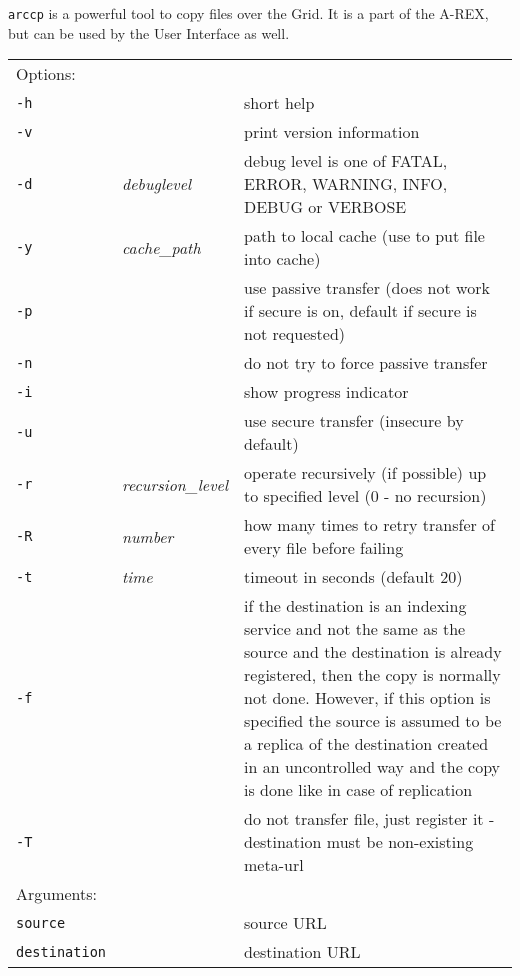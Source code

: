 \texttt{arccp} is a powerful
tool to copy files over the Grid. It is a part of the A-REX,
but can be used by the User Interface as well.
\hspace*{0.5cm}
\begin{shaded}
\end{shaded}
\begin{longtable}{llp{8cm}}
    Options:&&\\
    \texttt{-h} && short help\\
    \texttt{-v} && print version information\\
    \texttt{-d} & \textit{debuglevel} &debug level is one of  FATAL, ERROR, WARNING, INFO, DEBUG or VERBOSE\\
    \texttt{-y} & \textit{cache\_path} & path to local cache (use to put file into cache)\\
    \texttt{-p} && use passive transfer (does not work if secure is on, default if secure is not requested)\\
    \texttt{-n} && do not try to force passive transfer\\
    \texttt{-i} && show progress indicator\\
    \texttt{-u} && use secure transfer (insecure by default)\\
    \texttt{-r} & \textit{recursion\_level} & operate recursively (if possible) up to specified level (0 - no recursion)\\
    \texttt{-R} & \textit{number} & how many times to retry transfer of every file before failing\\
    \texttt{-t} & \textit{time} & timeout in seconds (default 20)\\
    \texttt{-f} && if the destination is an indexing service and not the same as the source and the destination is already registered, then the copy is normally not done. However, if this option is specified the source is assumed to be a replica of the destination created in an uncontrolled way and the copy is done like in case of replication\\
    \texttt{-T} && do not transfer file, just register it - destination must be non-existing meta-url\\
    Arguments:&&\\
    \texttt{source} && source URL\\
    \texttt{destination} && destination URL\\
\end{longtable}

